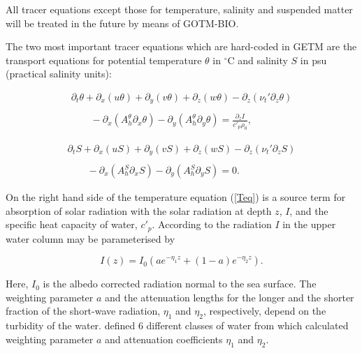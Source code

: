 All tracer equations except those for temperature, salinity and 
suspended matter will be treated in the future by means of GOTM-BIO.

The two most important tracer equations which are hard-coded in GETM
are the transport equations for potential temperature $\theta$ in $^{\circ}$C
and salinity $S$ in psu (practical salinity units):

\begin{equation}\label{Teq}
\begin{array}{l}
\partial_t \theta +\partial_x (u\theta) +\partial_y(v\theta) +\partial_z (w\theta)
-\partial_z(\nu_t' \partial_z \theta)
\\ \\ \displaystyle \qquad
-\partial_x(A_h^\theta \partial_x \theta)
-\partial_y(A_h^\theta \partial_y \theta)
=\frac{\partial_z I}{c'_p \rho_0},
\end{array} 
\end{equation}

\begin{equation}\label{Seq}
\begin{array}{l}
\partial_t S +\partial_x (uS) +\partial_y(vS) +\partial_z (wS)
-\partial_z(\nu_t' \partial_z S)
\\ \\ \displaystyle \qquad
-\partial_x(A_h^S \partial_x S)
-\partial_y(A_h^S \partial_y S)
=0.
\end{array} 
\end{equation}

On the right hand side of the temperature equation (\ref{Teq})
is a source term 
for absorption of solar radiation with the solar radiation at depth $z$,
$I$, and the specific heat capacity of water, $c'_p$. 
According to \cite{PAULSONea77} the radiation $I$ in the upper
water column may be parameterised by

\begin{equation}\label{Light}
I(z) = I_0 \left(ae^{-\eta_1z}+(1-a)e^{-\eta_2z}\right).
\end{equation}

Here, $I_0$ is the albedo corrected radiation normal to the sea surface.
The weighting parameter $a$ and the 
attenuation lengths for the
longer and the shorter fraction of the short-wave radiation,
$\eta_1$ and $\eta_2$, respectively, depend on the turbidity of the water.
\cite{JERLOV68} defined 6 different classes of water
from which \cite{PAULSONea77} calculated weighting parameter $a$
and attenuation coefficients $\eta_1$ and $\eta_2$.

